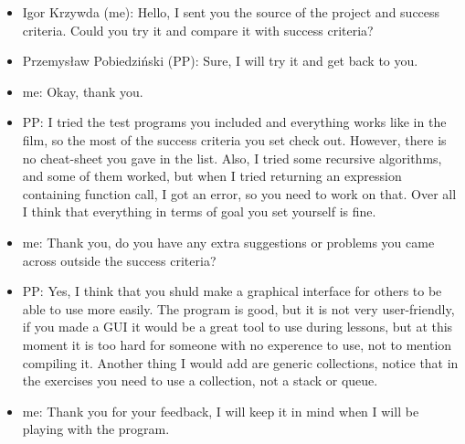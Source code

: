 \documentclass{article}
\begin{document}
    \begin{itemize}
        \item Igor Krzywda (me): Hello, I sent you the source of the project and
            success criteria. Could you try it and compare it with success criteria?
        \item Przemysław Pobiedziński (PP): Sure, I will try it and get back to 
            you.
        \item me: Okay, thank you.
        \item PP: I tried the test programs you included and everything works 
            like in the film, so the most of the success criteria you set check
            out. However, there is no cheat-sheet you gave in the list. Also, I 
            tried some recursive algorithms, and some of them worked, but when
            I tried returning an expression containing function call, I got an 
            error, so you need to work on that. Over all I think that everything
            in terms of goal you set yourself is fine.
        \item me: Thank you, do you have any extra suggestions or problems you 
            came across outside the success criteria?
        \item PP: Yes, I think that you shuld make a graphical interface for others
            to be able to use more easily. The program is good, but it is not
            very user-friendly, if you made a GUI it would be a great tool to use
            during lessons, but at this moment it is too hard for someone with 
            no experence to use, not to mention compiling it. Another thing I 
            would add are generic collections, notice that in the exercises you 
            need to use a collection, not a stack or queue. 
        \item me: Thank you for your feedback, I will keep it in mind when I will
            be playing with the program.
    \end{itemize}
\end{document}
